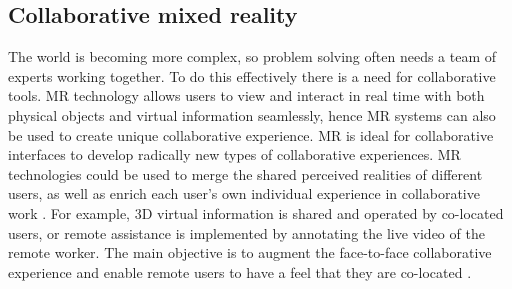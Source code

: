 \subsection{Collaborative mixed reality}
The world is becoming more complex, so problem solving often needs a team of experts working together. To do this effectively there is a need for collaborative tools.
MR technology allows users to view and interact in real time with both physical objects and virtual information seamlessly, hence MR systems can also be used to create unique collaborative experience. 
MR is ideal for collaborative interfaces to develop radically new types of collaborative experiences. MR technologies could be used to merge the shared perceived realities of different users, as well as enrich each user's own individual experience in collaborative work \cite{Lukosch2015a}. 
For example, 3D virtual information is shared and operated by co-located users, or remote assistance is implemented by annotating the live video of the remote worker. The main objective is to augment the face-to-face collaborative experience and enable remote users to have a feel that they are co-located \cite{Lukosch2015}. 

